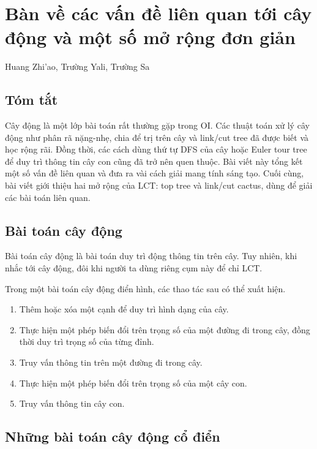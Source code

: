 \documentclass[11pt]{article}
\begin{document}
\section{Bàn về các vấn đề liên quan tới cây động và một số mở rộng đơn giản}

\begin{center}
Huang Zhi'ao, Trường Yali, Trường Sa
\end{center}

\subsection*{Tóm tắt}

Cây động là một lớp bài toán rất thường gặp trong OI. Các thuật toán xử lý cây
động như phân rã nặng-nhẹ, chia để trị trên cây và link/cut tree đã được biết
và học rộng rãi. Đồng thời, các cách dùng thứ tự DFS của cây hoặc Euler tour
tree để duy trì thông tin cây con cũng đã trở nên quen thuộc. Bài viết này tổng
kết một số vấn đề liên quan và đưa ra vài cách giải mang tính sáng tạo. Cuối
cùng, bài viết giới thiệu hai mở rộng của LCT: top tree và link/cut cactus, dùng
để giải các bài toán liên quan.

\subsection{Bài toán cây động}

Bài toán cây động là bài toán duy trì động thông tin trên cây. Tuy nhiên, khi
nhắc tới cây động, đôi khi người ta dùng riêng cụm này để chỉ LCT.

Trong một bài toán cây động điển hình, các thao tác sau có thể xuất hiện.

\begin{enumerate}
  \item Thêm hoặc xóa một cạnh để duy trì hình dạng của cây.
  \item Thực hiện một phép biến đổi trên trọng số của một đường đi trong cây,
  đồng thời duy trì trọng số của từng đỉnh.
  \item Truy vấn thông tin trên một đường đi trong cây.
  \item Thực hiện một phép biến đổi trên trọng số của một cây con.
  \item Truy vấn thông tin cây con.
\end{enumerate}

\subsection{Những bài toán cây động cổ điển}
\end{document}
